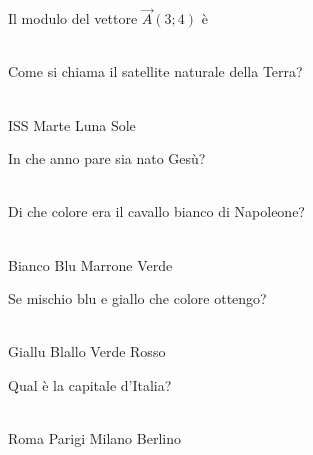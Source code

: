 \documentclass[a4paper,11pt]{exam}
\begin{document}
    

        \begin{center} 
        \end{center}
\begin{questions}

    
\question Il modulo del vettore $\vec{A}(3;4)$ è\\\
\begin{oneparchoices}
\end{oneparchoices}

    
\question Come si chiama il satellite naturale della Terra?\\\
\begin{oneparchoices}
  \choice ISS
  \choice Marte
  \choice Luna
  \choice Sole
\end{oneparchoices}

    
\question In che anno pare sia nato Gesù?\\\
\begin{oneparchoices}
  \choice 0
  \choice -80
  \choice 2019
\end{oneparchoices}

    
\question Di che colore era il cavallo bianco di Napoleone?\\\
\begin{oneparchoices}
  \choice Bianco
  \choice Blu 
  \choice Marrone
  \choice Verde
\end{oneparchoices}

    
\question Se mischio blu e giallo che colore ottengo?\\\
\begin{oneparchoices}
  \choice Giallu
  \choice Blallo
  \choice Verde
  \choice Rosso
\end{oneparchoices}

    
\question Qual è la capitale d’Italia?\\\
\begin{oneparchoices}
  \choice Roma
  \choice Parigi
  \choice Milano
  \choice Berlino
\end{oneparchoices}


\end{questions}
\end{document}
